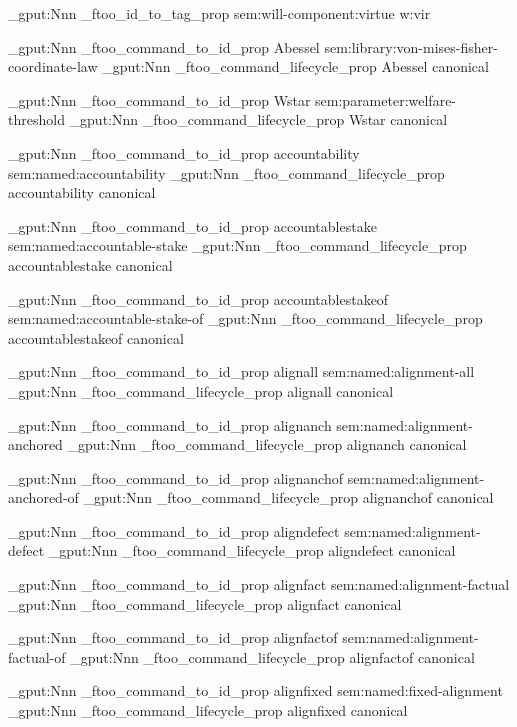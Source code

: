 \prop_gput:Nnn \g_ftoo_id_to_tag_prop { sem:will-component:virtue } { w:vir }




\prop_gput:Nnn \g_ftoo_command_to_id_prop { Abessel } { sem:library:von-mises-fisher-coordinate-law }
\prop_gput:Nnn \g_ftoo_command_lifecycle_prop { Abessel } { canonical }


\prop_gput:Nnn \g_ftoo_command_to_id_prop { Wstar } { sem:parameter:welfare-threshold }
\prop_gput:Nnn \g_ftoo_command_lifecycle_prop { Wstar } { canonical }


\prop_gput:Nnn \g_ftoo_command_to_id_prop { accountability } { sem:named:accountability }
\prop_gput:Nnn \g_ftoo_command_lifecycle_prop { accountability } { canonical }


\prop_gput:Nnn \g_ftoo_command_to_id_prop { accountablestake } { sem:named:accountable-stake }
\prop_gput:Nnn \g_ftoo_command_lifecycle_prop { accountablestake } { canonical }


\prop_gput:Nnn \g_ftoo_command_to_id_prop { accountablestakeof } { sem:named:accountable-stake-of }
\prop_gput:Nnn \g_ftoo_command_lifecycle_prop { accountablestakeof } { canonical }


\prop_gput:Nnn \g_ftoo_command_to_id_prop { alignall } { sem:named:alignment-all }
\prop_gput:Nnn \g_ftoo_command_lifecycle_prop { alignall } { canonical }


\prop_gput:Nnn \g_ftoo_command_to_id_prop { alignanch } { sem:named:alignment-anchored }
\prop_gput:Nnn \g_ftoo_command_lifecycle_prop { alignanch } { canonical }


\prop_gput:Nnn \g_ftoo_command_to_id_prop { alignanchof } { sem:named:alignment-anchored-of }
\prop_gput:Nnn \g_ftoo_command_lifecycle_prop { alignanchof } { canonical }


\prop_gput:Nnn \g_ftoo_command_to_id_prop { aligndefect } { sem:named:alignment-defect }
\prop_gput:Nnn \g_ftoo_command_lifecycle_prop { aligndefect } { canonical }


\prop_gput:Nnn \g_ftoo_command_to_id_prop { alignfact } { sem:named:alignment-factual }
\prop_gput:Nnn \g_ftoo_command_lifecycle_prop { alignfact } { canonical }


\prop_gput:Nnn \g_ftoo_command_to_id_prop { alignfactof } { sem:named:alignment-factual-of }
\prop_gput:Nnn \g_ftoo_command_lifecycle_prop { alignfactof } { canonical }


\prop_gput:Nnn \g_ftoo_command_to_id_prop { alignfixed } { sem:named:fixed-alignment }
\prop_gput:Nnn \g_ftoo_command_lifecycle_prop { alignfixed } { canonical }


